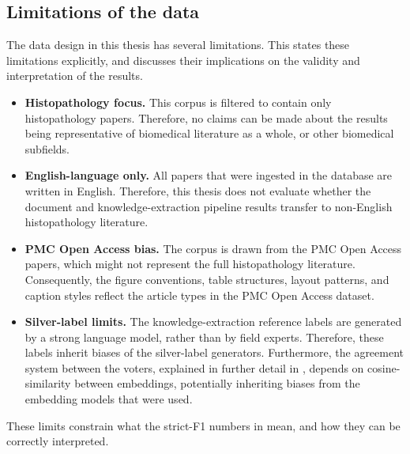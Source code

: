 \subsection{Limitations of the data}

The data design in this thesis has several limitations. This  states these limitations explicitly, and  discusses their implications on the validity and interpretation of the results. 

\begin{itemize}
    \item \textbf{Histopathology focus.} This corpus is filtered to contain only histopathology papers. Therefore, no claims can be made about the results being representative of biomedical literature as a whole, or other biomedical subfields.
    \item \textbf{English-language only.} All papers that were ingested in the database are written in English. Therefore, this thesis does not evaluate whether the document and knowledge-extraction pipeline results transfer to non-English histopathology literature.
    \item \textbf{PMC Open Access bias.} The corpus is drawn from the PMC Open Access papers, which might not represent the full histopathology literature. Consequently, the figure conventions, table structures, layout patterns, and caption styles reflect the article types in the PMC Open Access dataset. 
    \item \textbf{Silver-label limits.} The knowledge-extraction reference labels are generated by a strong language model, rather than by field experts. Therefore, these labels inherit biases of the silver-label generators. Furthermore, the agreement system between the voters, explained in further detail in , depends on cosine-similarity between embeddings, potentially inheriting biases from the embedding models that were used. 
\end{itemize}

These limits constrain what the strict-F1 numbers in  mean, and how they can be correctly interpreted.

